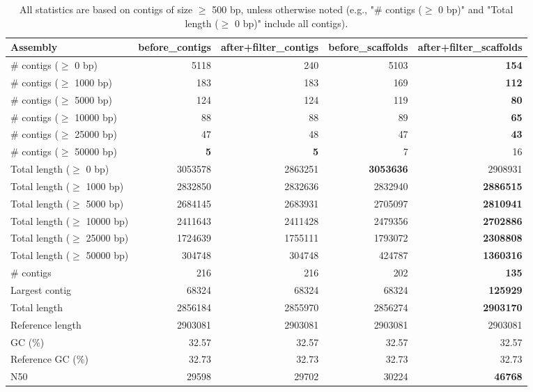 \documentclass[12pt,a4paper]{article}
\begin{document}
\begin{table}[ht]
\begin{center}
\caption{All statistics are based on contigs of size $\geq$ 500 bp, unless otherwise noted (e.g., "\# contigs ($\geq$ 0 bp)" and "Total length ($\geq$ 0 bp)" include all contigs).}
\begin{tabular}{|l*{4}{|r}|}
\hline
Assembly & before\_contigs & after+filter\_contigs & before\_scaffolds & after+filter\_scaffolds \\ \hline
\# contigs ($\geq$ 0 bp) & 5118 & 240 & 5103 & {\bf 154} \\ \hline
\# contigs ($\geq$ 1000 bp) & 183 & 183 & 169 & {\bf 112} \\ \hline
\# contigs ($\geq$ 5000 bp) & 124 & 124 & 119 & {\bf 80} \\ \hline
\# contigs ($\geq$ 10000 bp) & 88 & 88 & 89 & {\bf 65} \\ \hline
\# contigs ($\geq$ 25000 bp) & 47 & 48 & 47 & {\bf 43} \\ \hline
\# contigs ($\geq$ 50000 bp) & {\bf 5} & {\bf 5} & 7 & 16 \\ \hline
Total length ($\geq$ 0 bp) & 3053578 & 2863251 & {\bf 3053636} & 2908931 \\ \hline
Total length ($\geq$ 1000 bp) & 2832850 & 2832636 & 2832940 & {\bf 2886515} \\ \hline
Total length ($\geq$ 5000 bp) & 2684145 & 2683931 & 2705097 & {\bf 2810941} \\ \hline
Total length ($\geq$ 10000 bp) & 2411643 & 2411428 & 2479356 & {\bf 2702886} \\ \hline
Total length ($\geq$ 25000 bp) & 1724639 & 1755111 & 1793072 & {\bf 2308808} \\ \hline
Total length ($\geq$ 50000 bp) & 304748 & 304748 & 424787 & {\bf 1360316} \\ \hline
\# contigs & 216 & 216 & 202 & {\bf 135} \\ \hline
Largest contig & 68324 & 68324 & 68324 & {\bf 125929} \\ \hline
Total length & 2856184 & 2855970 & 2856274 & {\bf 2903170} \\ \hline
Reference length & 2903081 & 2903081 & 2903081 & 2903081 \\ \hline
GC (\%) & 32.57 & 32.57 & 32.57 & 32.57 \\ \hline
Reference GC (\%) & 32.73 & 32.73 & 32.73 & 32.73 \\ \hline
N50 & 29598 & 29702 & 30224 & {\bf 46768} \\ \hline

\end{tabular}
\end{center}
\end{table}
\end{document}
